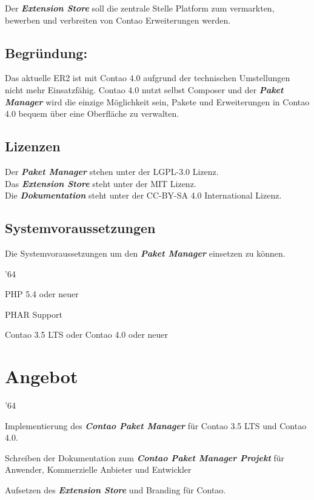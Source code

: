 \documentclass[
paper=a4,
draft=false,%
fontsize=10pt%
]{scrartcl}
\newcommand{\contaoPackageManagerProject}{\textbf{\textit{Contao Paket Manager Projekt}}}
\newcommand{\contaoPackageManager}{\textbf{\textit{Contao Paket Manager}}}
\newcommand{\packageManager}{\textbf{\textit{Paket Manager}}}
\newcommand{\store}{\textbf{\textit{Extension Store}}}
\newcommand{\documentation}{\textbf{\textit{Dokumentation}}}
\begin{document}
Der \store{} soll die zentrale Stelle Platform zum vermarkten, bewerben und verbreiten von Contao Erweiterungen werden.

\subsection{Begründung: }

Das aktuelle ER2 ist mit Contao 4.0 aufgrund der technischen Umstellungen nicht mehr Einsatzfähig. Contao 4.0 nutzt selbst Composer und der \packageManager{} wird die einzige Möglichkeit sein, Pakete und Erweiterungen in Contao 4.0 bequem über eine Oberfläche zu verwalten.

\pagebreak

\subsection{Lizenzen}

Der \packageManager{} stehen unter der LGPL-3.0 Lizenz.\\
Das \store{} steht unter der MIT Lizenz. \\
Die \documentation{} steht unter der CC-BY-SA 4.0 International Lizenz.

\subsection{Systemvoraussetzungen}

Die Systemvoraussetzungen um den \packageManager{} einsetzen zu können.

\begin{dinglist}{'64}
\item PHP 5.4 oder neuer
\item PHAR Support
\item Contao 3.5 LTS oder Contao 4.0 oder neuer
\end{dinglist}

\newpage

%
%

\section{Angebot}
\label{sec:offer}

\begin{dinglist}{'64}
\item Implementierung des \contaoPackageManager{} für Contao 3.5 LTS und Contao 4.0.
\item Schreiben der Dokumentation zum \contaoPackageManagerProject{} für Anwender, Kommerzielle Anbieter und Entwickler
\item Aufsetzen des \store{} und Branding für Contao.
\end{dinglist}
\end{document}
